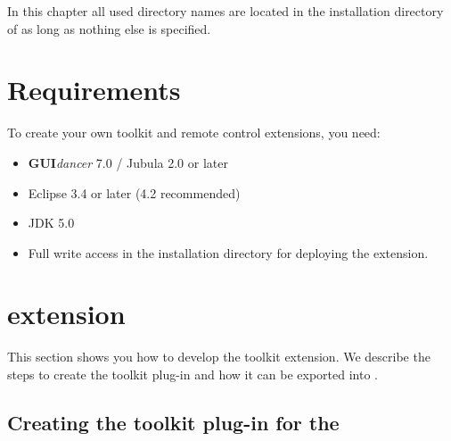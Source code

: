 In this chapter all used directory names are located in the
installation directory of \app{} as long as nothing else is specified.

\section{Requirements}
To create your own \ite{} toolkit and remote control extensions, you need:
\begin{itemize}
\item \textbf{GUI}\emph{dancer} 7.0 / Jubula 2.0 or later
\item Eclipse 3.4 or later (4.2 recommended)
\item JDK 5.0
\item Full write access in the \app{} installation directory for deploying the
extension.
\end{itemize}

\section{\ite{} extension}
\label{iteExtension}

This section shows you how to develop the \ite{} toolkit extension. We describe the
steps to create the toolkit plug-in and how it can be exported into \app{}.

\subsection{Creating the toolkit plug-in for the \ite{}}

